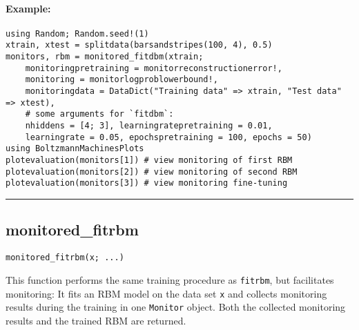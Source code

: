 \paragraph*{Example:}
\begin{verbatim}
using Random; Random.seed!(1)
xtrain, xtest = splitdata(barsandstripes(100, 4), 0.5)
monitors, rbm = monitored_fitdbm(xtrain;
    monitoringpretraining = monitorreconstructionerror!,
    monitoring = monitorlogproblowerbound!,
    monitoringdata = DataDict("Training data" => xtrain, "Test data" => xtest),
    # some arguments for `fitdbm`:
    nhiddens = [4; 3], learningratepretraining = 0.01,
    learningrate = 0.05, epochspretraining = 100, epochs = 50)
using BoltzmannMachinesPlots
plotevaluation(monitors[1]) # view monitoring of first RBM
plotevaluation(monitors[2]) # view monitoring of second RBM
plotevaluation(monitors[3]) # view monitoring fine-tuning
\end{verbatim}
\noindent\rule{\textwidth}{1pt}
\subsection*{monitored\_fitrbm}
\begin{verbatim}
monitored_fitrbm(x; ...)
\end{verbatim}
This function performs the same training procedure as \texttt{fitrbm}, but facilitates monitoring: It fits an RBM model on the data set \texttt{x} and collects monitoring results during the training in one \texttt{Monitor} object. Both the collected monitoring results and the trained RBM are returned.

